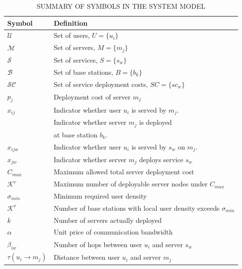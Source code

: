 \documentclass[10pt, conference, letterpaper]{IEEEtran}
\begin{document}
\begin{table}[!t]
\centering
\caption{SUMMARY OF SYMBOLS IN THE SYSTEM MODEL}
\label{table:variables_extended}
\begin{tabular}{|>{\centering\arraybackslash}m{2cm}|>{\raggedright\arraybackslash}m{6cm}|}
    \hline
    \textbf{Symbol} & \textbf{Definition} \\
    \hline
    $\mathcal{U}$ & Set of users, $U = \{u_i\}$ \\ \hline
    $\mathcal{M}$ & Set of servers, $M = \{m_j\}$ \\ \hline
    $\mathcal{S}$ & Set of services, $S = \{s_w\}$ \\ \hline
    $\mathcal{B}$ & Set of base stations, $B = \{b_k\}$ \\ \hline
    $\mathcal{SC}$ & Set of service deployment costs, $SC = \{sc_w\}$ \\ \hline
    $p_j$ & Deployment cost of server $m_j$ \\ \hline
    $x_{ij}$ & Indicator whether user $u_i$ is served by $m_j$.\\ \hline
    \multirow{2}{*}{$x_{jk}$} & Indicator whether server $m_j$ is deployed \\ 
    & at base station $b_k$.\\ \hline
    $x_{ijw}$ & Indicator whether user $u_i$ is served by $s_w$ on $m_j$. \\ \hline
    $x_{jw}$ & Indicator whether server $m_j$ deploys service $s_w$ \\ \hline
    $C_{max}$ & Maximum allowed total server deployment cost \\ \hline
    $\mathcal{K}^c$ & Maximum number of deployable server nodes under $C_{max}$ \\ \hline
    $\sigma_{min}$ & Minimum required user density \\ \hline
   $\mathcal{K}^r$ & Number of base stations with local user density exceeds $\sigma_{min}$ \\ \hline
    $k$ & Number of servers actually deployed \\ \hline
    $\alpha$ & Unit price of communication bandwidth \\ \hline
    $\beta_{iw}$ & Number of hops between user $u_i$ and server $s_w$ \\ \hline
    $\tau(u_i \rightarrow m_j)$ & Distance between user $u_i$ and server $m_j$ \\ \hline

\end{tabular}
\end{table}
\end{document}
